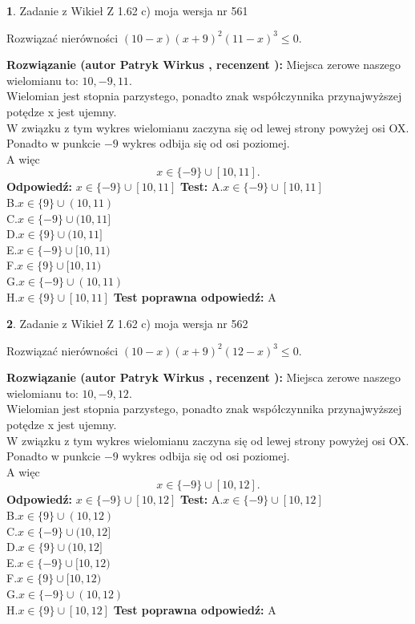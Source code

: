 \documentclass[12pt, a4paper]{article}
\theoremstyle{definition} %
\newtheorem{zad}{}
\newcommand{\zadStart}[1]{\begin{zad}#1\newline}
\newcommand{\zadStop}{\end{zad}}
\newcommand{\rozwStart}[2]{\noindent \textbf{Rozwiązanie (autor #1 , recenzent #2): }\newline}
\newcommand{\rozwStop}{\newline}
\newcommand{\odpStart}{\noindent \textbf{Odpowiedź:}\newline}
\newcommand{\odpStop}{\newline}
\newcommand{\testStart}{\noindent \textbf{Test:}\newline}
\newcommand{\testStop}{\newline}
\newcommand{\kluczStart}{\noindent \textbf{Test poprawna odpowiedź:}\newline}
\newcommand{\kluczStop}{\newline}
\begin{document}
\zadStart{Zadanie z Wikieł Z 1.62 c) moja wersja nr 561}

Rozwiązać nierówności $(10-x)(x+9)^{2}(11-x)^{3}\le0$.
\zadStop
\rozwStart{Patryk Wirkus}{}
Miejsca zerowe naszego wielomianu to: $10, -9, 11$.\\
Wielomian jest stopnia parzystego, ponadto znak współczynnika przy\linebreak najwyższej potędze x jest ujemny.\\ W związku z tym wykres wielomianu zaczyna się od lewej strony powyżej osi OX.\\
Ponadto w punkcie $-9$ wykres odbija się od osi poziomej.\\
A więc $$x \in \{-9\} \cup [10,11].$$
\rozwStop
\odpStart
$x \in \{-9\} \cup [10,11]$
\odpStop
\testStart
A.$x \in \{-9\} \cup [10,11]$\\
B.$x \in \{9\} \cup (10,11)$\\
C.$x \in \{-9\} \cup (10,11]$\\
D.$x \in \{9\} \cup (10,11]$\\
E.$x \in \{-9\} \cup [10,11)$\\
F.$x \in \{9\} \cup [10,11)$\\
G.$x \in \{-9\} \cup (10,11)$\\
H.$x \in \{9\} \cup [10,11]$
\testStop
\kluczStart
A
\kluczStop



\zadStart{Zadanie z Wikieł Z 1.62 c) moja wersja nr 562}

Rozwiązać nierówności $(10-x)(x+9)^{2}(12-x)^{3}\le0$.
\zadStop
\rozwStart{Patryk Wirkus}{}
Miejsca zerowe naszego wielomianu to: $10, -9, 12$.\\
Wielomian jest stopnia parzystego, ponadto znak współczynnika przy\linebreak najwyższej potędze x jest ujemny.\\ W związku z tym wykres wielomianu zaczyna się od lewej strony powyżej osi OX.\\
Ponadto w punkcie $-9$ wykres odbija się od osi poziomej.\\
A więc $$x \in \{-9\} \cup [10,12].$$
\rozwStop
\odpStart
$x \in \{-9\} \cup [10,12]$
\odpStop
\testStart
A.$x \in \{-9\} \cup [10,12]$\\
B.$x \in \{9\} \cup (10,12)$\\
C.$x \in \{-9\} \cup (10,12]$\\
D.$x \in \{9\} \cup (10,12]$\\
E.$x \in \{-9\} \cup [10,12)$\\
F.$x \in \{9\} \cup [10,12)$\\
G.$x \in \{-9\} \cup (10,12)$\\
H.$x \in \{9\} \cup [10,12]$
\testStop
\kluczStart
A
\kluczStop
\end{document}
